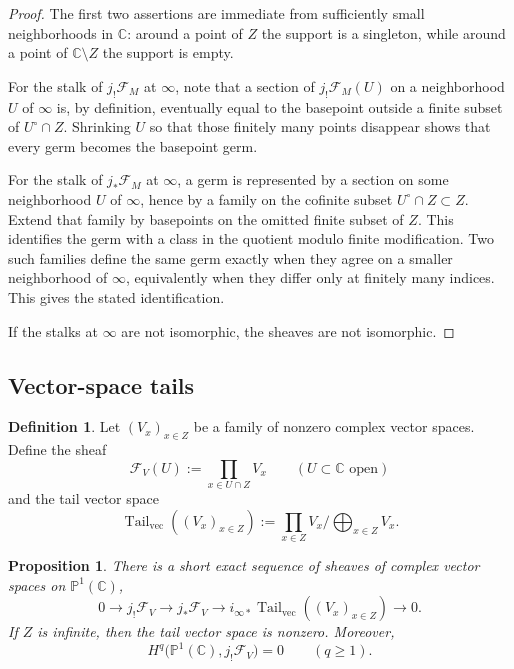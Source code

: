 \documentclass[11pt,a4paper]{article}
\numberwithin{equation}{section}
\newtheorem{proposition}[theorem]{Proposition}
\theoremstyle{definition}
\newtheorem{definition}[theorem]{Definition}
\theoremstyle{remark}
\DeclareMathOperator{\Tail}{Tail}
\newcommand{\CC}{\mathbb C}
\newcommand{\PP}{\mathbb P}
\begin{document}
\begin{proof}
The first two assertions are immediate from sufficiently small neighborhoods in $\CC$: around a point of $Z$ the support is a singleton, while around a point of $\CC\setminus Z$ the support is empty.

For the stalk of $j_!\mathcal F_M$ at $\infty$, note that a section of $j_!\mathcal F_M(U)$ on a neighborhood $U$ of $\infty$ is, by definition, eventually equal to the basepoint outside a finite subset of $U^\circ\cap Z$.  Shrinking $U$ so that those finitely many points disappear shows that every germ becomes the basepoint germ.

For the stalk of $j_*\mathcal F_M$ at $\infty$, a germ is represented by a section on some neighborhood $U$ of $\infty$, hence by a family on the cofinite subset $U^\circ\cap Z\subset Z$.  Extend that family by basepoints on the omitted finite subset of $Z$.  This identifies the germ with a class in the quotient modulo finite modification.  Two such families define the same germ exactly when they agree on a smaller neighborhood of $\infty$, equivalently when they differ only at finitely many indices.  This gives the stated identification.

If the stalks at $\infty$ are not isomorphic, the sheaves are not isomorphic.
\end{proof}

\subsection{Vector-space tails}

\begin{definition}
Let $(V_x)_{x\in Z}$ be a family of nonzero complex vector spaces.  Define the sheaf
\[
\mathcal F_V(U):=\prod_{x\in U\cap Z}V_x
\qquad (U\subset\CC\text{ open})
\]
and the tail vector space
\[
\Tail_{\mathrm{vec}}((V_x)_{x\in Z}):=\prod_{x\in Z}V_x\Big/\bigoplus_{x\in Z}V_x.
\]
\end{definition}

\begin{proposition}\label{P1:prop:vector-tail-exact}
There is a short exact sequence of sheaves of complex vector spaces on $\PP^1(\CC)$,
\[
0\longrightarrow j_!\mathcal F_V
\longrightarrow j_*\mathcal F_V
\longrightarrow i_{\infty *}\Tail_{\mathrm{vec}}((V_x)_{x\in Z})
\longrightarrow0.
\]
If $Z$ is infinite, then the tail vector space is nonzero.  Moreover,
\[
H^q\bigl(\PP^1(\CC),j_!\mathcal F_V\bigr)=0
\qquad (q\ge1).
\]
\end{proposition}
\end{document}
